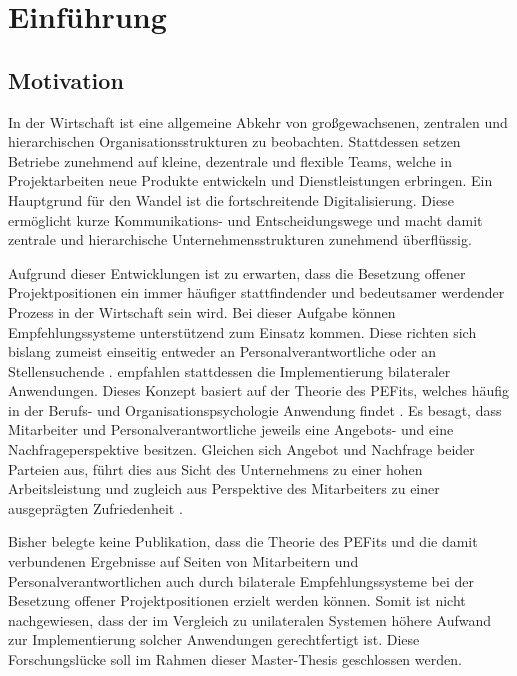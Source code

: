 \chapter{Einführung}
\label{ch:intro}

\section{Motivation}
\label{sec:intro:motivation}
In der Wirtschaft ist eine allgemeine Abkehr von großgewachsenen, zentralen und hierarchischen Organisationsstrukturen zu beobachten. Stattdessen setzen Betriebe zunehmend auf kleine, dezentrale und flexible Teams, welche in Projektarbeiten neue Produkte entwickeln und Dienstleistungen erbringen. Ein Hauptgrund für den Wandel ist die fortschreitende Digitalisierung. Diese ermöglicht kurze Kommunikations- und Entscheidungswege und macht damit zentrale und hierarchische Unternehmensstrukturen zunehmend überflüssig. \cite[S. 2ff.]{elanceEconomy:1999}

Aufgrund dieser Entwicklungen ist zu erwarten, dass die Besetzung offener Projektpositionen ein immer häufiger stattfindender und bedeutsamer werdender Prozess in der Wirtschaft sein wird. Bei dieser Aufgabe können Empfehlungssysteme unterstützend zum Einsatz kommen. Diese richten sich bislang zumeist einseitig entweder an Personalverantwortliche oder an Stellensuchende \cite[S. 2f.]{siting:2012}. \textcite[S. 1]{malinowski:2006} empfahlen stattdessen die Implementierung bilateraler Anwendungen. Dieses Konzept basiert auf der Theorie des \aclp{PEFit}, welches häufig in der Berufs- und Organisationspsychologie Anwendung findet \cite[S. 2]{guan:2021}\cite[S. 1ff.]{malinowski:2006}. Es besagt, dass Mitarbeiter und Personalverantwortliche jeweils eine Angebots- und eine Nachfrageperspektive besitzen. Gleichen sich Angebot und Nachfrage beider Parteien aus, führt dies aus Sicht des Unternehmens zu einer hohen Arbeitsleistung und zugleich aus Perspektive des Mitarbeiters zu einer ausgeprägten Zufriedenheit \cite[S. 6]{su:2015}.

Bisher belegte keine Publikation, dass die Theorie des \aclp{PEFit} und die damit verbundenen Ergebnisse auf Seiten von Mitarbeitern und Personalverantwortlichen auch durch bilaterale Empfehlungssysteme bei der Besetzung offener Projektpositionen erzielt werden können. Somit ist nicht nachgewiesen, dass der im Vergleich zu unilateralen Systemen höhere Aufwand zur Implementierung solcher Anwendungen gerechtfertigt ist. Diese Forschungslücke soll im Rahmen dieser Master-Thesis geschlossen werden.

